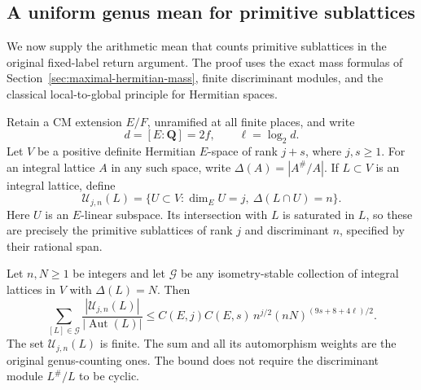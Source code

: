 \subsection{A uniform genus mean for primitive sublattices}
\label{sec:primitive-sublattice-genus-mean}

We now supply the arithmetic mean that counts primitive sublattices
in the original fixed-label return argument.  The proof uses
the exact mass formulas of Section~\ref{sec:maximal-hermitian-mass},
finite discriminant modules, and the classical local-to-global
principle for Hermitian spaces.

Retain a CM extension \(E/F\), unramified at all finite places,
and write
\[
 d=[E:\mathbf Q]=2f,\qquad \ell=\log_2d.
\]
Let \(V\) be a positive definite Hermitian \(E\)-space of rank
\(j+s\), where \(j,s\geq1\).  For an integral lattice \(A\) in
any such space, write \(\Delta(A)=|A^\#/A|\).
If \(L\subset V\) is an integral lattice, define
\[
 \mathcal U_{j,n}(L)=
 \{U\subset V:\dim_EU=j,\ \Delta(L\cap U)=n\}.
 \tag{PG1}
\]
Here \(U\) is an \(E\)-linear subspace.  Its intersection
with \(L\) is saturated in \(L\), so these are precisely the
primitive sublattices of rank \(j\) and discriminant \(n\),
specified by their rational span.

\begin{theorem}
\label{thm:primitive-sublattice-genus-mean}
Let \(n,N\geq1\) be integers and let \(\mathcal G\) be any
isometry-stable collection of integral lattices in \(V\) with
\(\Delta(L)=N\).  Then
\[
 \sum_{[L]\in\mathcal G}
        \frac{|\mathcal U_{j,n}(L)|}{|\operatorname{Aut}(L)|}
 \leq C(E,j)C(E,s)\,
      n^{j/2}(nN)^{(9s+8+4\ell)/2}.
 \tag{PG2}
\]
The set \(\mathcal U_{j,n}(L)\) is finite.  The sum and all its
automorphism weights are the original genus-counting ones.
The bound does not require the discriminant module \(L^\#/L\)
to be cyclic.
\end{theorem}

